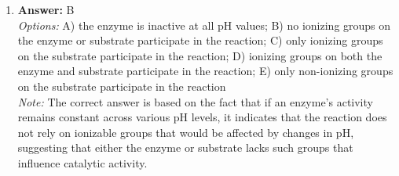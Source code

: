 \documentclass[12pt]{article}
\begin{document}
\begin{enumerate}[label=\arabic*.]
\\ \textit{Note:} Conjugation in paramecia requires genetic diversity between individuals, and if all individuals descended from a single individual through repeated fission, they would be genetically identical, making conjugation impossible.
\item \textbf{Answer:} B
\\ \textit{Options:} A) the enzyme is inactive at all pH values; B) no ionizing groups on the enzyme or substrate participate in the reaction; C) only ionizing groups on the substrate participate in the reaction; D) ionizing groups on both the enzyme and substrate participate in the reaction; E) only non-ionizing groups on the substrate participate in the reaction
\\ \textit{Note:} The correct answer is based on the fact that if an enzyme's activity remains constant across various pH levels, it indicates that the reaction does not rely on ionizable groups that would be affected by changes in pH, suggesting that either the enzyme or substrate lacks such groups that influence catalytic activity.
\end{enumerate}
\end{document}
